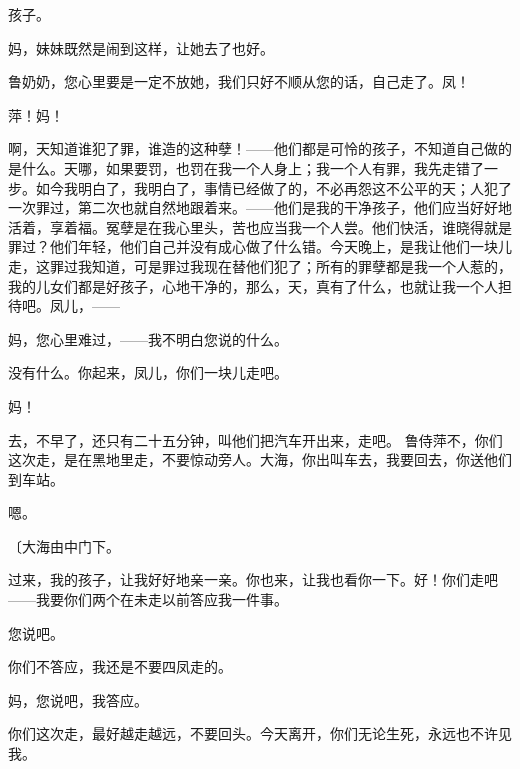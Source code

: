 孩子。

妈，妹妹既然是闹到这样，让她去了也好。

鲁奶奶，您心里要是一定不放她，我们只好不顺从您的话，自己走了。凤！

萍！妈！

啊，天知道谁犯了罪，谁造的这种孽！——他们都是可怜的孩子，不知道自己做的是什么。天哪，如果要罚，也罚在我一个人身上；我一个人有罪，我先走错了一步。如今我明白了，我明白了，事情已经做了的，不必再怨这不公平的天；人犯了一次罪过，第二次也就自然地跟着来。——他们是我的干净孩子，他们应当好好地活着，享着福。冤孽是在我心里头，苦也应当我一个人尝。他们快活，谁晓得就是罪过？他们年轻，他们自己并没有成心做了什么错。今天晚上，是我让他们一块儿走，这罪过我知道，可是罪过我现在替他们犯了；所有的罪孽都是我一个人惹的，我的儿女们都是好孩子，心地干净的，那么，天，真有了什么，也就让我一个人担待吧。凤儿，——

妈，您心里难过，——我不明白您说的什么。

没有什么。你起来，凤儿，你们一块儿走吧。

妈！

去，不早了，还只有二十五分钟，叫他们把汽车开出来，走吧。
鲁侍萍不，你们这次走，是在黑地里走，不要惊动旁人。大海，你出叫车去，我要回去，你送他们到车站。

嗯。

{\fangsong〔大海由中门下。}

过来，我的孩子，让我好好地亲一亲。你也来，让我也看你一下。好！你们走吧——我要你们两个在未走以前答应我一件事。

您说吧。

你们不答应，我还是不要四凤走的。

妈，您说吧，我答应。

你们这次走，最好越走越远，不要回头。今天离开，你们无论生死，永远也不许见我。

